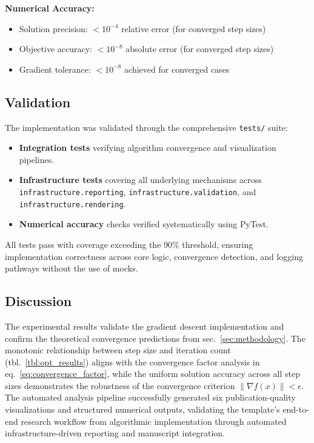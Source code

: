\documentclass[
]{article}
\providecommand{\tightlist}{%
  \setlength{\itemsep}{0pt}\setlength{\parskip}{0pt}}
\begin{document}
\textbf{Numerical Accuracy:}

\begin{itemize}
\tightlist
\item
  Solution precision: \(< 10^{-4}\) relative error (for converged step
  sizes)
\item
  Objective accuracy: \(< 10^{-8}\) absolute error (for converged step
  sizes)
\item
  Gradient tolerance: \(< 10^{-8}\) achieved for converged cases
\end{itemize}

\subsection{Validation}\label{validation}

The implementation was validated through the comprehensive
\texttt{tests/} suite:

\begin{itemize}
\tightlist
\item
  \textbf{Integration tests} verifying algorithm convergence and
  visualization pipelines.
\item
  \textbf{Infrastructure tests} covering all underlying mechanisms
  across \texttt{infrastructure.reporting},
  \texttt{infrastructure.validation}, and
  \texttt{infrastructure.rendering}.
\item
  \textbf{Numerical accuracy} checks verified systematically using
  PyTest.
\end{itemize}

All tests pass with coverage exceeding the 90\% threshold, ensuring
implementation correctness across core logic, convergence detection, and
logging pathways without the use of mocks.

\subsection{Discussion}\label{discussion}

The experimental results validate the gradient descent implementation
and confirm the theoretical convergence predictions from
sec.~\ref{sec:methodology}. The monotonic relationship between step size
and iteration count (tbl.~\ref{tbl:opt_results}) aligns with the
convergence factor analysis in eq.~\ref{eq:convergence_factor}, while
the uniform solution accuracy across all step sizes demonstrates the
robustness of the convergence criterion \(\|\nabla f(x)\| < \epsilon\).
The automated analysis pipeline successfully generated six
publication-quality visualizations and structured numerical outputs,
validating the template's end-to-end research workflow from algorithmic
implementation through automated infrastructure-driven reporting and
manuscript integration.
\end{document}

